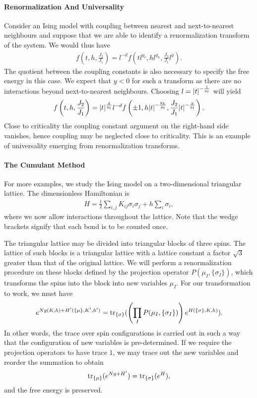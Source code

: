 \paragraph{Renormalization And Universality}
Consider an Ising model with coupling between nearest and next-to-nearest neighbours and suppose that we are able to identify a renormalization transform of the system. We would thus have
\begin{align*}
	f\left(t, h, \frac{J_{2}}{J_{1}}\right) = l^{-d}f\left(tl^{y_{t}}, hl^{y_{h}}, \frac{J_{2}}{J_{1}}l^{y}\right).
\end{align*}
The quotient between the coupling constants is also necessary to specify the free energy in this case. We expect that $y < 0$ for such a transform as there are no interactions beyond next-to-nearest neighbours. Choosing $l = \abs{t}^{-\frac{1}{y_{t}}}$ will yield
\begin{align*}
	f\left(t, h, \frac{J_{2}}{J_{1}}\right) = \abs{t}^{\frac{d}{y_{t}}}l^{-d}f\left(\pm 1, h\abs{t}^{-\frac{y_{h}}{y_{t}}}, \frac{J_{2}}{J_{1}}\abs{t}^{-\frac{y}{y_{t}}}\right).
\end{align*}
Close to criticality the coupling constant argument on the right-hand side vanishes, hence coupling may be neglected close to criticality. This is an example of universality emerging from renormalization transforms.

\paragraph{The Cumulant Method}
For more examples, we study the Ising model on a two-dimensional triangular lattice. The dimensionless Hamiltonian is
\begin{align*}
	H = \frac{1}{2}\sum\limits_{i, j}K_{ij}\sigma_{i}\sigma_{j} + h\sum\limits_{i}\sigma_{i},
\end{align*}
where we now allow interactions throughout the lattice. Note that the wedge brackets signify that each bond is to be counted once.

The triangular lattice may be divided into triangular blocks of three spins. The lattice of such blocks is a triangular lattice with a lattice constant a factor $\sqrt{3}$ greater than that of the original lattice. We will perform a renormalization procedure on these blocks defined by the projection operator $P(\mu_{I}, \{\sigma_{I}\})$, which transforms the spins into the block into new variables $\mu_{I}$. For our transformation to work, we must have
\begin{align*}
	e^{Ng(K, h) + H^{\prime}(\{\mu\}, K^{\prime}, h^{\prime})} = \tr\limits_{\{\sigma\}}(\left(\prod\limits_{I}P(\mu_{I}, \{\sigma_{I}\})\right)e^{H(\{\sigma\}, K , h)}).
\end{align*}
In other words, the trace over spin configurations is carried out in such a way that the configuration of new variables is pre-determined. If we require the projection operators to have trace $1$, we may trace out the new variables and reorder the summation to obtain
\begin{align*}
	\tr\limits_{\{\mu\}}(e^{Ng + H^{\prime}}) = \tr\limits_{\{\sigma\}}(e^{H}),
\end{align*}
and the free energy is preserved.

